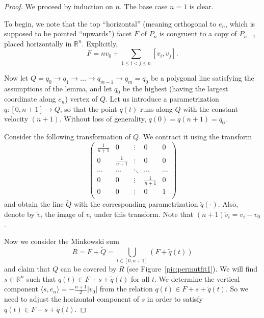 \documentclass[12pt,a4paper,oneside]{amsart}
\theoremstyle{definition}
\theoremstyle{remark}
\numberwithin{equation}{section}
\begin{document}
\begin{proof}
We proceed by induction on $n$. The base case $n = 1$ is clear.

To begin, we note that the top ``horizontal'' (meaning orthogonal to $e_n$, which is supposed to be pointed ``upwards'') facet $F$ of $P_n$ is congruent to a copy of $P_{n-1}$ placed horizontally in $\mathbb{R}^n$. Explicitly,
$$
F = n v_0 + \sum\limits_{1\le i < j\le n} [v_i, v_j].
$$

Now let $Q = q_0 \to q_1 \to \ldots \to q_{m-1} \to q_m = q_0$ be a polygonal line satisfying the assumptions of the lemma, and let $q_0$ be the highest (having the largest coordinate along $e_n$) vertex of $Q$. Let us introduce a parametrization $q : [0,n+1] \to Q$, so that the point $q(t)$ runs along $Q$ with the constant velocity $(n+1)$. Without loss of generality, $q(0) = q(n+1) = q_0$.

Consider the following transformation of $Q$. We contract it using the transform
$$
\begin{pmatrix}
\frac{1}{n+1} & 0 & \vdots & 0 & 0\\
 0 & \frac{1}{n+1} & \vdots & 0 & 0\\
 \cdots & \cdots & \ddots & \cdots & \cdots\\
 0 & 0 & \vdots & \frac{1}{n+1} & 0\\
 0 & 0 & \vdots & 0 & 1\\
\end{pmatrix}
$$
and obtain the line $\widetilde Q$ with the corresponding parametrization $\widetilde q(\cdot)$. Also, denote by $\widetilde v_i$ the image of $v_i$ under this transform. Note that $(n+1)\widetilde v_i =  v_i-v_0$.

Now we consider the Minkowski sum
$$
R = F + \widetilde Q = \bigcup\limits_{t\in[0,n+1]} (F + \widetilde q(t))
$$
and claim that $Q$ can be covered by $R$ (see Figure~\ref{pic:permutfit1}). We will find $s \in \mathbb{R}^n$ such that $q(t) \in F+s+\widetilde q(t)$ for all $t$. We determine the vertical component $\langle s, e_n \rangle = - \frac{n+1}{2} |v_0|$ from the relation $q(t) \in F+s+\widetilde q(t)$. So we need to adjust the horizontal component of $s$ in order to satisfy $q(t) \in F+s+\widetilde q(t)$.


\end{proof}
\end{document}
